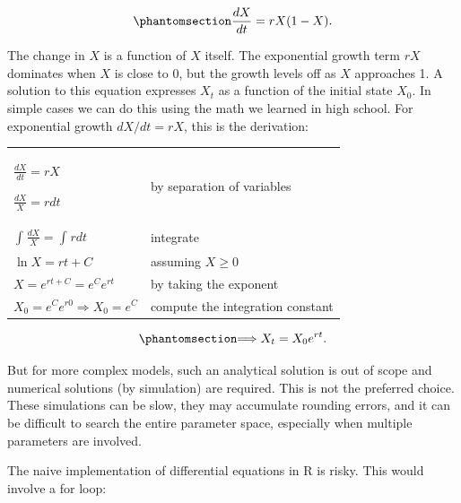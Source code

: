 \documentclass[
  a4paper,
  DIV=11,
  numbers=noendperiod,
  oneside]{scrreprt}
\begin{document}
\begin{equation}\phantomsection\label{eq-ch4n-1-old-21}{
\frac{dX}{dt} = rX(1 - X).
}\end{equation}

The change in \(X\) is a function of \(X\) itself. The exponential
growth term \(rX\) dominates when \(X\) is close to 0, but the growth
levels off as \(X\) approaches 1. A solution to this equation expresses
\(X_{t}\) as a function of the initial state \(X_{0}\). In simple cases
we can do this using the math we learned in high school. For exponential
growth \(dX/dt = rX\), this is the derivation:

\begin{longtable}[]{@{}
  >{\raggedright\arraybackslash}p{}
  >{\raggedright\arraybackslash}p{}@{}}
\toprule\noalign{}
\endhead
\bottomrule\noalign{}
\endlastfoot
\(\frac{dX}{dt} = rX\)

\(\frac{dX}{X} = rdt\) & by separation of variables \\
\(\int_{}^{}\frac{dX}{X} = \int_{}^{}{rdt}\) & integrate \\
\(\ln X = rt + C\) & assuming \(X \geq 0\) \\
\(X = e^{rt + C} = e^{C}e^{rt}\) & by taking the exponent \\
\(X_{0} = e^{C}e^{r0} \Longrightarrow X_{0} = e^{C}\) & compute the
integration constant \\
\end{longtable}

\begin{equation}\phantomsection\label{eq-ch4n-2-old-22}{
\Longrightarrow X_{t} = {X_{0}e}^{rt}.
}\end{equation}

But for more complex models, such an analytical solution is out of scope
and numerical solutions (by simulation) are required. This is not the
preferred choice. These simulations can be slow, they may accumulate
rounding errors, and it can be difficult to search the entire parameter
space, especially when multiple parameters are involved.

The naive implementation of differential equations in R is risky. This
would involve a for loop:
\end{document}
